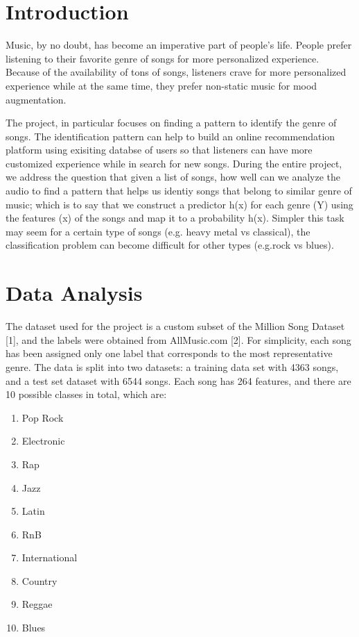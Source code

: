 \documentclass[journal]{IEEEtran}
\begin{document}
\section{Introduction}
Music, by no doubt, has become an imperative part of people's life. People prefer listening to their favorite genre of songs for more personalized experience. Because of the availability of tons of songs, listeners crave for more personalized experience while at the same time, they prefer non-static music for mood augmentation. \par
The project, in particular focuses on finding a pattern to identify the genre of songs. The identification pattern can help to build an online recommendation platform using exisiting databse of users so that listeners can have more customized experience while in search for new songs. During the entire project, we address the question that given a list of songs, how well can we analyze the audio to find a pattern that helps us identiy songs that belong to similar genre of music; which is to say that we construct a predictor h(x) for each genre (Y) using the features (x) of the songs and map it to a probability h(x). Simpler this task may seem for a certain type of songs (e.g. heavy metal vs classical), the classification problem can become difficult for other types (e.g.rock vs blues).


\section{Data Analysis}
The dataset used for the project is a custom subset of the Million Song Dataset [1], and the labels were obtained from AllMusic.com [2]. For simplicity, each song has been assigned only one label that corresponds to the most representative genre. The data is split into two datasets: a training data set with 4363 songs, and a test set dataset with 6544 songs. Each song has 264 features, and there are 10 possible classes in total, which are:
\begin{enumerate}
	\item Pop Rock
	\item Electronic
	\item Rap
	\item Jazz
	\item Latin
	\item RnB
	\item International
	\item Country
	\item Reggae
	\item Blues
\end{enumerate}
\end{document}
